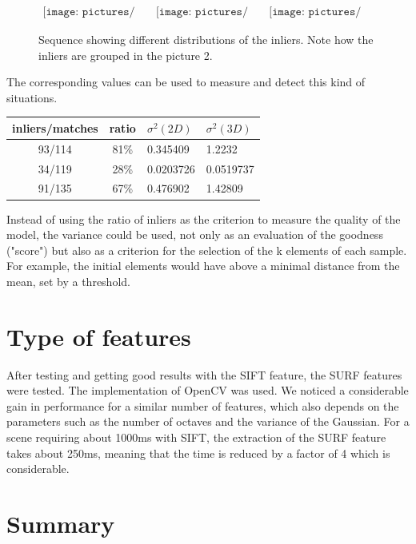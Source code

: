 \begin{figure}[H]
\centering$
 \begin{array}{ccc}
 \texttt{[image: pictures/bad\_transform1]} &
 \texttt{[image: pictures/bad\_transform2]} &
 \texttt{[image: pictures/bad\_transform3]}
 \end{array}$
\caption{Sequence showing different distributions of the inliers. Note how the inliers are grouped in the picture 2.}
\end{figure}

The corresponding values can be used to measure and detect this kind of situations.

\begin{tabular}{ccll}
 inliers/matches & ratio & $\sigma^2(2D)$ & $\sigma^2(3D)$\\
 \hline
 93/114 &	81\% &	0.345409 &	1.2232\\
 34/119 &	28\% &	0.0203726 &	0.0519737\\
 91/135 &	67\% &	0.476902 &	1.42809\\
\end{tabular}

Instead of using the ratio of inliers as the criterion to measure the quality of the model, the variance could be used, not only as an evaluation of the goodness ("score") but also as a criterion for the selection of the k elements of each sample. For example, the initial elements would have above a minimal distance from the mean, set by a threshold.

\section{Type of features}
After testing and getting good results with the \gls{SIFT} feature, the \gls{SURF} features~\cite{surf} were tested. The implementation of OpenCV was used. We noticed a considerable gain in performance for a similar number of features, which also depends on the parameters such as the number of octaves and the variance of the Gaussian. For a scene requiring about 1000ms with \gls{SIFT}, the extraction of the \gls{SURF} feature takes about 250ms, meaning that the time is reduced by a factor of 4 which is considerable.

\section{Summary}

